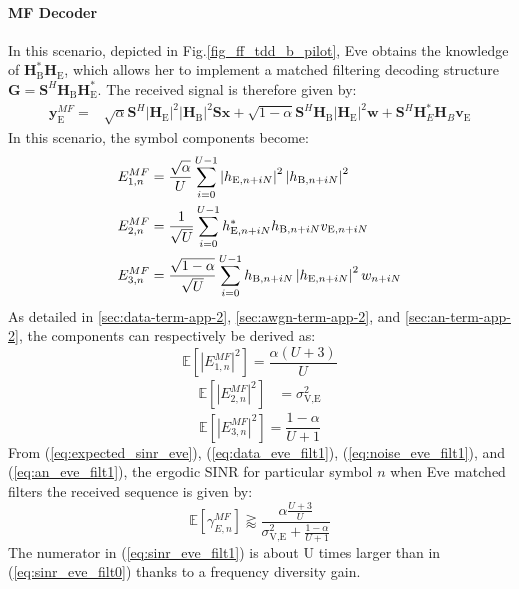 \documentclass[12pt, draftclsnofoot, onecolumn]{IEEEtran}
\newcommand{\module}[1]{\left|#1\right|}
\newcommand{\EX}[1]{\mathbb{E} \left[#1\right]}%
\newcommand{\HE}{\textbf{H}_{\text{E}}}
\newcommand{\HB}{\textbf{H}_{\text{B}}}
\newcommand{\ve}{\textbf{v}_{\text{E}}}
\newcommand{\spread}{\textbf{S}}
\newcommand{\w}{\textbf{w}}
\begin{document}
\paragraph{MF Decoder}
In this scenario, depicted in Fig.\ref{fig_ff_tdd_b_pilot}, Eve obtains the knowledge of $\HB^*\HE$, which allows her to implement a matched filtering decoding structure $\textbf{G} = \spread^H \HB\HE^*$. The received signal is therefore given by:
\begin{equation}
\begin{split}
\textbf{y}_{\text{E}}^{MF} =& \sqrt{\alpha} \spread^H \module{\HE}^2 \module{\HB}^2 \spread\textbf{x} +  \sqrt{1-\alpha} \spread^H \HB\module{\HE}^2 \w +  \spread^H  \textbf{H}^*_E \textbf{H}_B \ve
\end{split}
\label{eq:rx_eve_filt1}
\end{equation}
In this scenario, the symbol components become:
\begin{equation}
\begin{split}
E_{1,n}^{MF} &= \frac{\sqrt{\alpha}}{U}\sum_{i=0}^{U-1}  \left|h_{\text{E}, n + iN}\right|^2 \left|h_{\text{B}, n + iN}\right|^2 \\
E_{2,n}^{MF} &= \frac{1}{\sqrt{U}}\sum_{i=0}^{U-1} h^*_{\text{E}, n + iN} h_{\text{B}, n + iN} v_{\text{E}, n + iN}\\
E_{3,n}^{MF} &=\frac{ \sqrt{1-\alpha}  }{\sqrt{U}}\sum_{i=0}^{U-1}    h_{\text{\text{B}}, n + iN} \left|h_{\text{E}, n + iN}\right|^2w_{n + iN}
\end{split}
\end{equation}
As detailed in  \ref{sec:data-term-app-2},  \ref{sec:awgn-term-app-2}, and \ref{sec:an-term-app-2}, the components can respectively be derived as:
\begin{equation}
\EX{|E_{1,n}^{MF}|^2} =  \frac{\alpha (U+3)}{U}
\label{eq:data_eve_filt1}
\end{equation}
\begin{equation}
	\begin{split}
	\EX{|E_{2,n}^{MF}|^2} &= \sigma^2_{\text{V,E}}
	\end{split}
	\label{eq:noise_eve_filt1}
\end{equation}
\begin{equation}
	\EX{|E_{3,n}^{MF}|^2} = \frac{1-\alpha}{U+1}
	\label{eq:an_eve_filt1}
\end{equation}
From (\ref{eq:expected_sinr_eve}), (\ref{eq:data_eve_filt1}), (\ref{eq:noise_eve_filt1}), and (\ref{eq:an_eve_filt1}),  the ergodic SINR for particular symbol $n$ when Eve matched filters the received sequence is given by:
\begin{equation}
\EX{\gamma_{E,n}^{MF}} \gtrapprox \frac{\alpha \frac{U+3}{U}}{\sigma^2_{\text{V,E}} + \frac{1-\alpha}{U+1}}
\label{eq:sinr_eve_filt1}
\end{equation}
The numerator in (\ref{eq:sinr_eve_filt1}) is about U times larger than in (\ref{eq:sinr_eve_filt0}) thanks to a frequency diversity gain.
\end{document}
